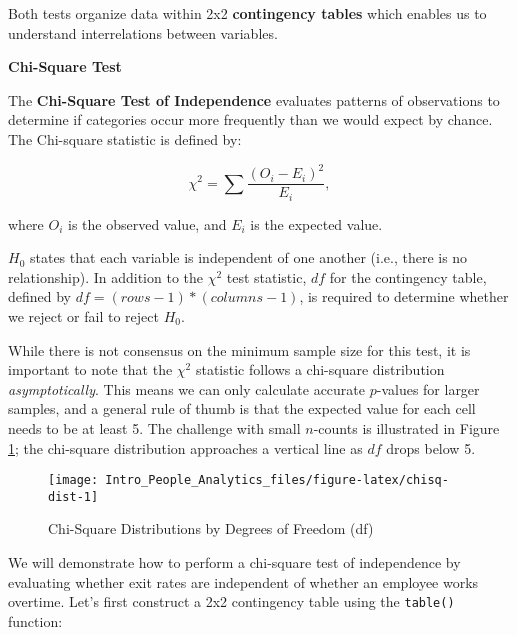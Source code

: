 \documentclass[
]{book}
\newenvironment{Shaded}{\begin{snugshade}}{\end{snugshade}}
\newcommand{\CommentTok}[1]{\textcolor[rgb]{0.56,0.35,0.01}{\textit{#1}}}
\newcommand{\FunctionTok}[1]{\textcolor[rgb]{0.00,0.00,0.00}{#1}}
\newcommand{\NormalTok}[1]{#1}
\newcommand{\OtherTok}[1]{\textcolor[rgb]{0.56,0.35,0.01}{#1}}
\newcommand{\SpecialCharTok}[1]{\textcolor[rgb]{0.00,0.00,0.00}{#1}}
\begin{document}
Both tests organize data within 2x2 \textbf{contingency tables} which enables us to understand interrelations between variables.

\textbf{Chi-Square Test}

The \textbf{Chi-Square Test of Independence} evaluates patterns of observations to determine if categories occur more frequently than we would expect by chance. The Chi-square statistic is defined by:

\[ {\chi}^2 = \sum\frac{(O_i - E_i)^2}{E_i}, \]

where \(O_i\) is the observed value, and \(E_i\) is the expected value.

\(H_0\) states that each variable is independent of one another (i.e., there is no relationship). In addition to the \({\chi}^2\) test statistic, \(df\) for the contingency table, defined by \(df = (rows - 1) * (columns - 1)\), is required to determine whether we reject or fail to reject \(H_0\).

While there is not consensus on the minimum sample size for this test, it is important to note that the \({\chi}^2\) statistic follows a chi-square distribution \emph{asymptotically}. This means we can only calculate accurate \(p\)-values for larger samples, and a general rule of thumb is that the expected value for each cell needs to be at least 5. The challenge with small \(n\)-counts is illustrated in Figure \ref{fig:chisq-dist}; the chi-square distribution approaches a vertical line as \(df\) drops below 5.

\begin{figure}

{\centering \texttt{[image: Intro\_People\_Analytics\_files/figure-latex/chisq-dist-1]} 

}

\caption{Chi-Square Distributions by Degrees of Freedom (df)}\label{fig:chisq-dist}
\end{figure}

We will demonstrate how to perform a chi-square test of independence by evaluating whether exit rates are independent of whether an employee works overtime. Let's first construct a 2x2 contingency table using the \texttt{table()} function:

\begin{Shaded}
\end{Shaded}
\end{document}
